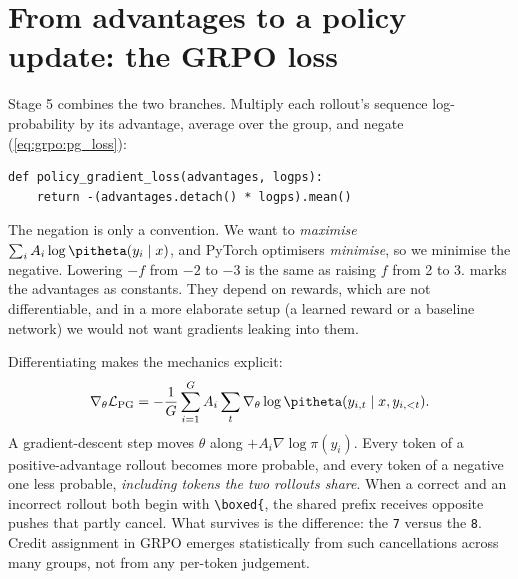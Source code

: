 \section{From advantages to a policy update: the GRPO loss}\label{sec:grpo:loss}

Stage 5 combines the two branches. Multiply each rollout's sequence log-probability by its
advantage, average over the group, and negate (\cref{eq:grpo:pg_loss}):

\begin{lstlisting}[caption={The policy-gradient loss.},label={lst:grpo:pgloss}]
def policy_gradient_loss(advantages, logps):
    return -(advantages.detach() * logps).mean()
\end{lstlisting}

The negation is only a convention. We want to \emph{maximise}
$\sum_iA_i\log\pitheta(y_i\mid x)$, and PyTorch optimisers \emph{minimise}, so we minimise the
negative. Lowering $-f$ from $-2$ to $-3$ is the same as raising $f$ from 2 to 3.
 marks the advantages as constants. They depend on rewards, which are not
differentiable, and in a more elaborate setup (a learned reward or a baseline network) we
would not want gradients leaking into them.

Differentiating makes the mechanics explicit:
\begin{equation}
\nabla_\theta\mathcal{L}_{\text{PG}}=-\frac1G\sum_{i=1}^G A_i\sum_t\nabla_\theta\log\pitheta(y_{i,t}\mid x,y_{i,<t}).
\end{equation}
A gradient-descent step moves $\theta$ along $+A_i\nabla\log\pi(y_i)$. Every token of a
positive-advantage rollout becomes more probable, and every token of a negative one less
probable, \emph{including tokens the two rollouts share}. When a correct and an incorrect
rollout both begin with \verb|\boxed{|, the shared prefix receives opposite pushes that
partly cancel. What survives is the difference: the \verb|7| versus the \verb|8|.
Credit assignment in GRPO emerges statistically from such cancellations across many groups,
not from any per-token judgement.

